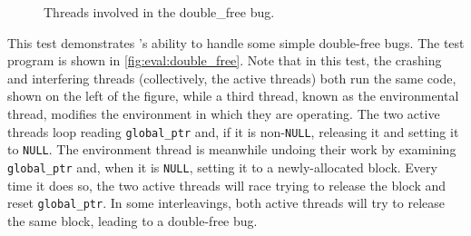 \begin{figure}
  \hfill
  \caption{Threads involved in the double\_free bug.}
  \label{fig:eval:double_free}
\end{figure}

This test demonstrates {\technique}'s ability to handle some simple
double-free bugs.  The test program is shown in
\autoref{fig:eval:double_free}.  Note that in this test, the
crashing and interfering threads (collectively, the active threads)
both run the same code, shown on the left of the figure, while a third
thread, known as the environmental thread, modifies the environment in
which they are operating.  The two active threads loop reading
\texttt{global\_ptr} and, if it is non-\texttt{NULL}, releasing it and
setting it to \texttt{NULL}.  The environment thread is meanwhile
undoing their work by examining \texttt{global\_ptr} and, when it is
\texttt{NULL}, setting it to a newly-allocated block.  Every time it
does so, the two active threads will race trying to release the block
and reset \texttt{global\_ptr}.  In some interleavings, both active
threads will try to release the same block, leading to a double-free
bug.

